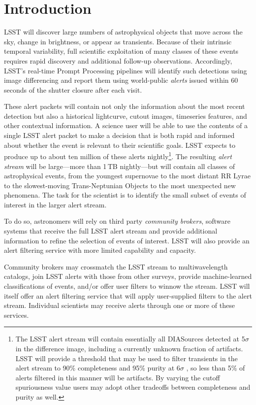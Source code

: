 \section{Introduction}\label{sec:introduction}

LSST will discover large numbers of astrophysical objects that move across the sky, change in brightness, or appear as transients.
Because of their intrinsic temporal variability, full scientific exploitation of many classes of these events requires rapid discovery and additional follow-up observations.
Accordingly, LSST's real-time Prompt Processing pipelines will identify such detections using image differencing and report them using world-public \textit{alerts} issued within 60 seconds of the shutter closure after each visit.

These alert packets will contain not only the information about the most recent detection but also a historical lightcurve, cutout images, timeseries features, and other contextual information.
A science user will be able to use the contents of a single LSST alert packet to make a decision that is both rapid and informed about whether the event is relevant to their scientific goals.
LSST expects to produce up to about ten million of these alerts nightly\footnote{The LSST alert stream will contain essentially all DIASources detected at 5$\sigma$ in the difference image, including a currently unknown fraction of artifacts. 
LSST will provide a threshold that may be used to filter transients in the alert stream to 90\% completeness and 95\% purity at 6$\sigma$ , so less than 5\% of alerts filtered in this manner will be artifacts.
By varying the cutoff spuriousness value users may adopt other tradeoffs between completeness and purity as well.}.
The resulting \textit{alert stream} will be large---more than 1\,TB nightly---but will contain all classes of astrophysical events, from the youngest supernovae to the most distant RR Lyrae to the slowest-moving Trans-Neptunian Objects to the most unexpected new phenomena.
The task for the scientist is to identify the small subset of events of interest in the larger alert stream.

To do so, astronomers will rely on third party \textit{community brokers}, software systems that receive the full LSST alert stream and provide additional information to refine the selection of events of interest.
LSST will also provide an alert filtering service with more limited capability and capacity.

Community brokers may crossmatch the LSST stream to multiwavelength catalogs, join LSST alerts with those from other surveys, provide machine-learned classifications of events, and/or offer user filters to winnow the stream.
LSST will itself offer an alert filtering service that will apply user-supplied filters to the alert stream.
Individual scientists may receive alerts through one or more of these services.

